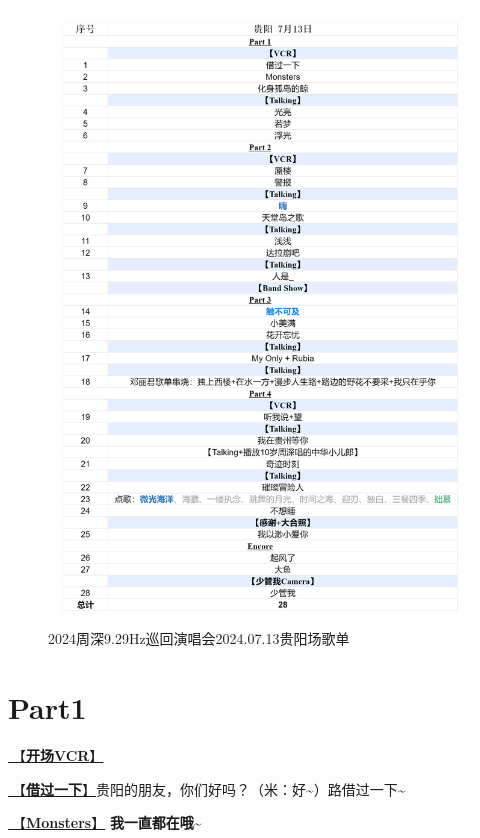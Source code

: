 \documentclass[]{ctexbook}
\begin{document}
\begin{figure}

{\centering \includegraphics[width=330pt]{img/playlists/playlists-guiyang-20240713} 

}

\caption{2024周深9.29Hz巡回演唱会2024.07.13贵阳场歌单}\label{fig:unnamed-chunk-52}
\end{figure}

\newpage

\section{Part1}\label{guiyang-20240713-part1}

\hyperref[opening-vcr]{🎥【\textbf{开场VCR}】}

\hyperref[I-will-go-my-way]{🎵【\textbf{借过一下}】}贵阳的朋友，你们好吗？（米：好\textasciitilde）路借过一下\textasciitilde{}

\hyperref[Monsters]{🎵【\textbf{Monsters}】} \textbf{我一直都在哦\textasciitilde{}}
\end{document}

